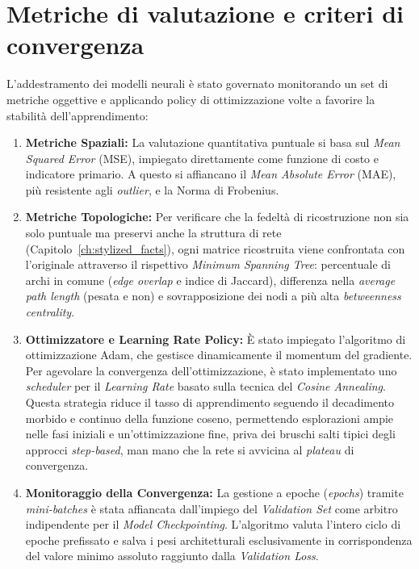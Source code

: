 \section{Metriche di valutazione e criteri di convergenza}
\label{sec:metriche_convergenza}

L'addestramento dei modelli neurali è stato governato monitorando un set di metriche oggettive e applicando policy di ottimizzazione volte a favorire la stabilità dell'apprendimento:

\begin{enumerate}
    \item \textbf{Metriche Spaziali:} La valutazione quantitativa puntuale si basa sul \emph{Mean Squared Error} (MSE), impiegato direttamente come funzione di costo e indicatore primario. A questo si affiancano il \emph{Mean Absolute Error} (MAE), più resistente agli \emph{outlier}, e la Norma di Frobenius.

    \item \textbf{Metriche Topologiche:} Per verificare che la fedeltà di ricostruzione non sia solo puntuale ma preservi anche la struttura di rete (Capitolo~\ref{ch:stylized_facts}), ogni matrice ricostruita viene confrontata con l'originale attraverso il rispettivo \emph{Minimum Spanning Tree}: percentuale di archi in comune (\emph{edge overlap} e indice di Jaccard), differenza nella \emph{average path length} (pesata e non) e sovrapposizione dei nodi a più alta \emph{betweenness centrality}.

    \item \textbf{Ottimizzatore e Learning Rate Policy:} È stato impiegato l'algoritmo di ottimizzazione Adam, che gestisce dinamicamente il momentum del gradiente. Per agevolare la convergenza dell'ottimizzazione, è stato implementato uno \emph{scheduler} per il \emph{Learning Rate} basato sulla tecnica del \emph{Cosine Annealing}. Questa strategia riduce il tasso di apprendimento seguendo il decadimento morbido e continuo della funzione coseno, permettendo esplorazioni ampie nelle fasi iniziali e un'ottimizzazione fine, priva dei bruschi salti tipici degli approcci \emph{step-based}, man mano che la rete si avvicina al \emph{plateau} di convergenza.
    
    \item \textbf{Monitoraggio della Convergenza:} La gestione a epoche (\emph{epochs}) tramite \emph{mini-batches} è stata affiancata dall'impiego del \emph{Validation Set} come arbitro indipendente per il \emph{Model Checkpointing}. L'algoritmo valuta l'intero ciclo di epoche prefissato e salva i pesi architetturali esclusivamente in corrispondenza del valore minimo assoluto raggiunto dalla \emph{Validation Loss}.
\end{enumerate}